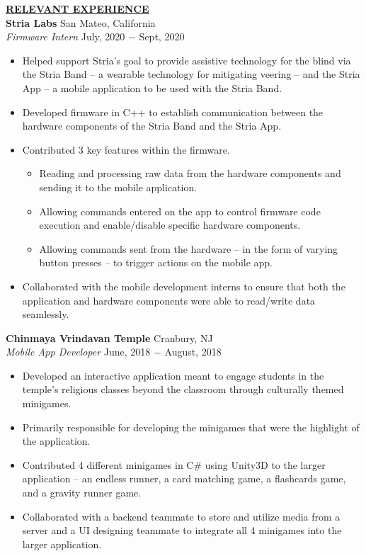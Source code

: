 \documentclass{article}
\begin{document}
\noindent \textbf{\underline{RELEVANT EXPERIENCE}} \\
\noindent \textbf{Stria Labs} \hfill San Mateo, California \\
\textit{Firmware Intern} \hfill July, 2020 $-$ Sept, 2020
\begin{itemize}[noitemsep,nolistsep,leftmargin=*]
\item {Helped support Stria's goal to provide assistive technology for the blind via the Stria Band -- a wearable technology for mitigating veering -- and the Stria App -- a mobile application to be used with the Stria Band.}
\item {Developed firmware in C++ to establish communication between the hardware components of the Stria Band and the Stria App.}
\item {Contributed 3 key features within the firmware.}
\begin{itemize}[noitemsep, nolistsep, leftmargin=*]
\item {Reading and processing raw data from the hardware components and sending it to the mobile application.}
\item {Allowing commands entered on the app to control firmware code execution and enable/disable specific hardware components.}
\item {Allowing commands sent from the hardware -- in the form of varying button presses -- to trigger actions on the mobile app.}
\end{itemize}
\item {Collaborated with the mobile development interns to ensure that both the application and hardware components were able to read/write data seamlessly.\\}
\end{itemize}

\noindent \textbf{Chinmaya Vrindavan Temple} \hfill Cranbury, NJ \\
\textit{Mobile App Developer} \hfill June, 2018 $-$ August, 2018
\begin{itemize}[noitemsep,nolistsep,leftmargin=*]
\item {Developed an interactive application meant to engage students in the temple's religious classes beyond the classroom through culturally themed minigames.}
\item {Primarily responsible for developing the minigames that were the highlight of the application.}
\item {Contributed 4 different minigames in C\# using Unity3D to the larger application -- an endless runner, a card matching game, a flashcards game, and a gravity runner game.}
\item {Collaborated with a backend teammate to store and utilize media from a server and a UI designing teammate to integrate all 4 minigames into the larger application.}\\
\end{itemize}
\end{document}
